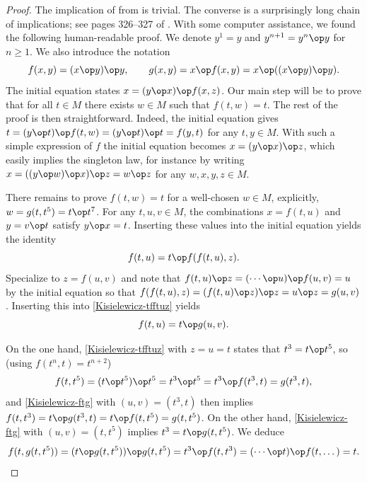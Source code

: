 \begin{proof}\leanok  The implication of  from  is trivial.  The converse is a surprisingly long chain of implications; see pages 326--327 of \cite{Kisielewicz2}.  With some computer assistance, we found the following human-readable proof.
We denote $y^1=y$ and $y^{n+1}=y^n\op y$ for $n\geq 1$.
We also introduce the notation
\begin{equation}
 f(x,y) = (x \op y) \op y , \qquad
 g(x,y) = x\op f(x,y) = x \op ((x \op y) \op y) .
\end{equation}
The initial equation states $x = (y \op x) \op f(x,z)$.
Our main step will be to prove that for all $t\in M$ there exists $w\in M$ such that $f(t,w) = t$.
The rest of the proof is then straightforward.
Indeed, the initial equation gives $t = (y \op t) \op f(t,w) = (y \op t) \op t = f(y,t)$ for any $t,y\in M$.
With such a simple expression of $f$ the initial equation becomes $x = (y \op x) \op z$, which easily implies the singleton law, for instance by writing $x = ((y \op w) \op x) \op z = w \op z$ for any $w,x,y,z \in M$.

There remains to prove $f(t,w) = t$ for a well-chosen $w \in M$, explicitly, $w=g(t,t^5)=t\op t^7$.
For any $t,u,v \in M$, the combinations $x = f(t,u)$ and $y = v \op t$ satisfy $y \op x = t$.  Inserting these values into the initial equation yields the identity
\begin{equation}\label{Kisielewicz-tfftuz}
f(t,u) = t \op f(f(t,u),z) .
\end{equation}
Specialize to $z=f(u,v)$ and note that $f(t,u) \op z = (\cdots \op u) \op f(u,v) = u$ by the initial equation so that $f(f(t,u),z) = (f(t,u) \op z) \op z = u \op z = g(u,v)$.  Inserting this into \eqref{Kisielewicz-tfftuz} yields
\begin{equation}\label{Kisielewicz-ftg}
f(t,u) = t \op g(u,v) .
\end{equation}

On the one hand, \eqref{Kisielewicz-tfftuz} with $z=u=t$ states that $t^3 = t \op t^5$, so (using $f(t^n,t)=t^{n+2}$)
\begin{equation}
  f(t,t^5) = (t \op t^5) \op t^5 = t^3 \op t^5 = t^3 \op f(t^3,t) = g(t^3,t) ,
\end{equation}
and \eqref{Kisielewicz-ftg} with $(u,v)=(t^3,t)$ then implies $f(t,t^3) = t \op g(t^3,t) = t \op f(t,t^5) = g(t,t^5)$.
On the other hand, \eqref{Kisielewicz-ftg} with $(u,v)=(t,t^5)$ implies $t^3 = t \op g(t,t^5)$.  We deduce
\begin{equation}
  f(t,g(t,t^5)) = (t \op g(t,t^5)) \op g(t,t^5) = t^3 \op f(t, t^3) = (\cdots \op t) \op f(t,\dots) = t .
\end{equation}
\end{proof}

